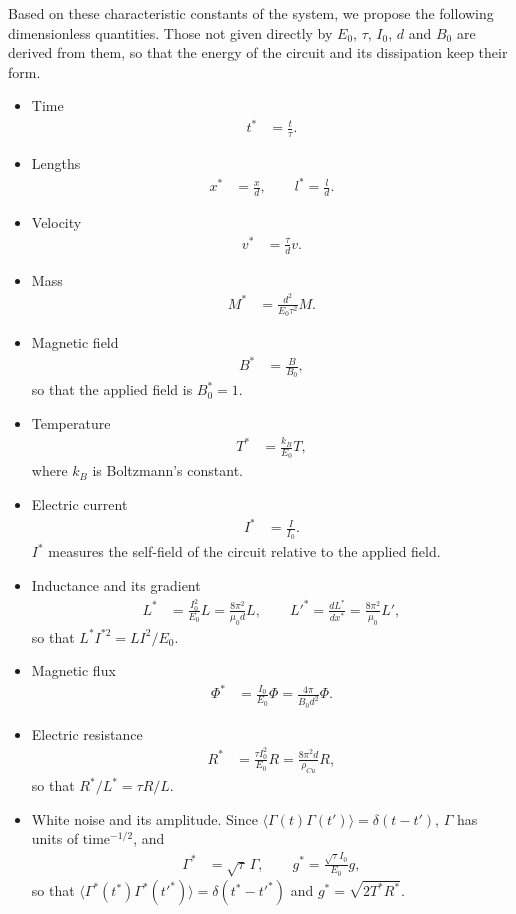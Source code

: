 \documentclass[11pt]{article}
\begin{document}
Based on these characteristic constants of the system, we propose the following dimensionless quantities. Those not given directly by $E_0$, $\tau$, $I_0$, $d$ and $B_0$ are derived from them, so that the energy of the circuit and its dissipation keep their form.
\begin{itemize}
\item Time
  \begin{align}
    t^*&=\frac{t}{\tau}.
  \end{align}
\item Lengths
  \begin{align}
    x^*&=\frac{x}{d},\qquad l^*=\frac{l}{d}.
  \end{align}
\item Velocity
  \begin{align}
    v^*&=\frac{\tau}{d}v.
  \end{align}
\item Mass
  \begin{align}
    M^*&=\frac{d^2}{E_0\tau^2}M.
  \end{align}
\item Magnetic field
  \begin{align}
    B^*&=\frac{B}{B_0},
  \end{align}
  so that the applied field is $B_0^*=1$.
\item Temperature
  \begin{align}
    T^*&=\frac{k_B}{E_0}T,
  \end{align}
  where $k_B$ is Boltzmann's constant.
\item Electric current
  \begin{align}
    I^*&=\frac{I}{I_0}.
  \end{align}
  $I^*$ measures the self-field of the circuit relative to the applied field.
\item Inductance and its gradient
  \begin{align}
    L^*&=\frac{I_0^2}{E_0}L=\frac{8\pi^2}{\mu_0d}L,\qquad L'^*=\frac{dL^*}{dx^*}=\frac{8\pi^2}{\mu_0}L',
  \end{align}
  so that $L^*I^{*2}=LI^2/E_0$.
\item Magnetic flux
  \begin{align}
    \Phi^*&=\frac{I_0}{E_0}\Phi=\frac{4\pi}{B_0d^2}\Phi.
  \end{align}
\item Electric resistance
  \begin{align}
    R^*&=\frac{\tau I_0^2}{E_0}R=\frac{8\pi^2d}{\rho_{Cu}}R,
  \end{align}
  so that $R^*/L^*=\tau R/L$.
\item White noise and its amplitude. Since $\langle\Gamma(t)\Gamma(t')\rangle=\delta(t-t')$, $\Gamma$ has units of $\text{time}^{-1/2}$, and
  \begin{align}
    \Gamma^*&=\sqrt{\tau}\,\Gamma,\qquad g^*=\frac{\sqrt{\tau}I_0}{E_0}g,
  \end{align}
  so that $\langle\Gamma^*(t^*)\Gamma^*(t'^*)\rangle=\delta(t^*-t'^*)$ and $g^*=\sqrt{2T^*R^*}$.
\end{itemize}
\end{document}
